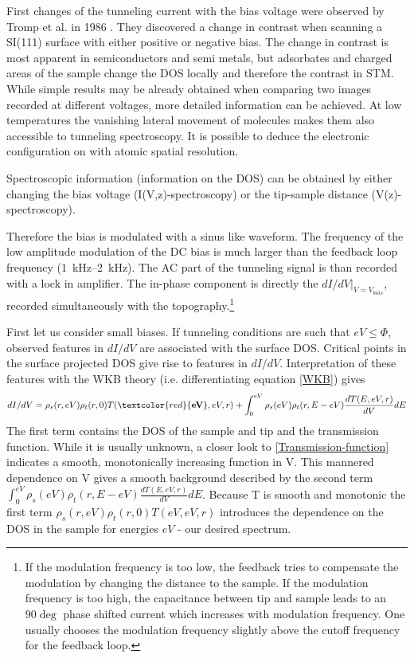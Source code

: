 \label{section:STS}
First changes of the tunneling current with the bias voltage were observed by Tromp et al. in 1986 \cite{tromp_atomic_1986}. They discovered a change in contrast when scanning a SI(111) surface with either positive or negative bias. The change in contrast is most apparent in semiconductors and semi metals\cite{bonnell_scanning_1993}, but adsorbates and charged areas of the sample change the DOS locally and therefore the contrast in STM. While simple results may be already obtained when comparing two images recorded at different voltages, more detailed information can be achieved. At low temperatures the vanishing lateral movement of molecules makes them also accessible to tunneling spectroscopy. It is possible to deduce the electronic configuration on with atomic spatial resolution.

Spectroscopic information (information on the DOS) can be obtained by either changing the bias voltage (I(V,z)-spectroscopy) or the tip-sample distance (V(z)-spectroscopy).  

Therefore the bias is modulated with a sinus like waveform. The frequency of the low amplitude modulation of the DC bias is much larger than the feedback loop frequency (\SIrange{1}{2}{\kilo \hertz}). The AC part of the tunneling signal is than recorded with a lock in amplifier. The in-phase component is directly the $dI/dV|_{V=V_{bias}}$, recorded simultaneously with the topography.\footnote{If the modulation frequency is too low, the feedback tries to compensate the modulation by changing the distance to the sample.	If the modulation frequency is too high, the capacitance between tip and sample leads to an $90\deg$ phase shifted current which increases with modulation frequency. One usually chooses the modulation frequency slightly above the cutoff frequency for the feedback loop.}

First let us consider small biases.
If tunneling conditions are such that $eV\leq\Phi$, observed features in $dI/dV$ are associated with the surface DOS. Critical points in the surface projected DOS give rise to features in $dI/dV$. Interpretation of these features with the WKB theory (i.e. differentiating equation \eqref{WKB}) gives
$$dI/dV=\rho_s(r,eV)\rho_t(r,0)T(\textcolor{red}{\textbf{eV}},eV,r)+\int_0^{eV}\rho_s(eV)\rho_t(r,E-eV)\frac{dT(E,eV,r)}{dV}dE$$
The first term contains the DOS of the sample and tip and the transmission function. While it is usually unknown, a closer look to \eqref{Transmission-function} indicates a smooth, monotonically increasing function in V. This mannered dependence on V gives a smooth background described by the second term $\int_0^{eV}\rho_s(eV)\rho_t(r,E-eV)\frac{dT(E,eV,r)}{dV}dE$.
Because T is smooth and monotonic the first term $\rho_s(r,eV)\rho_t(r,0)T(eV,eV,r)$ introduces the dependence on the DOS in the sample for energies $eV$ - our desired spectrum.


